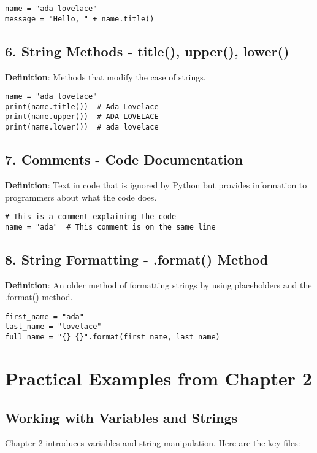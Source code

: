 \begin{lstlisting}
name = "ada lovelace"
message = "Hello, " + name.title()
\end{lstlisting}

\subsection*{6. String Methods - title(), upper(), lower()}
\textbf{Definition}: Methods that modify the case of strings.

\begin{lstlisting}
name = "ada lovelace"
print(name.title())  # Ada Lovelace
print(name.upper())  # ADA LOVELACE
print(name.lower())  # ada lovelace
\end{lstlisting}

\subsection*{7. Comments - Code Documentation}
\textbf{Definition}: Text in code that is ignored by Python but provides information to programmers about what the code does.

\begin{lstlisting}
# This is a comment explaining the code
name = "ada"  # This comment is on the same line
\end{lstlisting}

\subsection*{8. String Formatting - .format() Method}
\textbf{Definition}: An older method of formatting strings by using placeholders and the .format() method.

\begin{lstlisting}
first_name = "ada"
last_name = "lovelace"
full_name = "{} {}".format(first_name, last_name)
\end{lstlisting}

\section*{Practical Examples from Chapter 2}

\subsection*{Working with Variables and Strings}
Chapter 2 introduces variables and string manipulation. Here are the key files:


